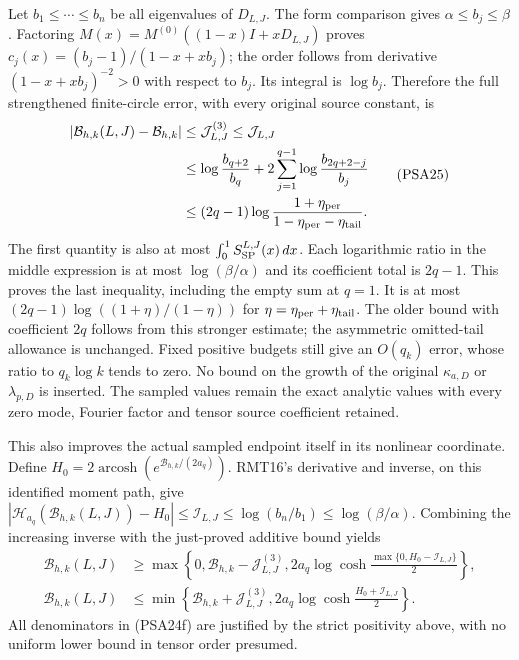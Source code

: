 Let $b_1\le\cdots\le b_n$ be all eigenvalues of $D_{L,J}$.
The form comparison gives $\alpha\le b_j\le\beta$.
Factoring $M(x)=M^{(0)}((1-x)I+xD_{L,J})$ proves
$c_j(x)=(b_j-1)/(1-x+xb_j)$; the order follows from derivative
$(1-x+xb_j)^{-2}>0$ with respect to $b_j$.
Its integral is $\log b_j$. Therefore the full strengthened
finite-circle error, with every original source constant, is
\[
 \begin{aligned}
 |\mathcal B_{h,k}(L,J)-\mathcal B_{h,k}|
 &\le\mathcal J^{(3)}_{L,J}\le\mathcal J_{L,J}\\
 &\le\log\frac{b_{q+2}}{b_q}
       +2\sum_{j=1}^{q-1}\log\frac{b_{2q+2-j}}{b_j}\\
 &\le(2q-1)\log\frac{1+\eta_{\rm per}}
                         {1-\eta_{\rm per}-\eta_{\rm tail}}.
 \end{aligned}
 \tag{PSA25}
\]
The first quantity is also at most $\int_0^1S_{\rm SP}^{L,J}(x)\,dx$.
Each logarithmic ratio in the middle expression is at most
$\log(\beta/\alpha)$ and its coefficient total is $2q-1$.
This proves the last inequality, including the empty sum at $q=1$.
It is at most $(2q-1)\log((1+\eta)/(1-\eta))$ for
$\eta=\eta_{\rm per}+\eta_{\rm tail}$. The older bound with
coefficient $2q$ follows from this stronger estimate; the
asymmetric omitted-tail allowance is unchanged.
Fixed positive budgets still give an $O(q_k)$ error, whose
ratio to $q_k\log k$ tends to zero. No bound on the growth of
the original $\kappa_{a,D}$ or $\lambda_{p,D}$ is inserted.
The sampled values remain the exact analytic values with every
zero mode, Fourier factor and tensor source coefficient retained.



This also improves the actual sampled endpoint itself in its
nonlinear coordinate. Define
$H_0=2\operatorname{arcosh}(e^{\mathcal B_{h,k}/(2a_q)})$.
RMT16's derivative and inverse, on this identified moment path,
give $|\mathscr H_{a_q}(\mathcal B_{h,k}(L,J))-H_0|
\le\mathcal I_{L,J}\le\log(b_n/b_1)\le\log(\beta/\alpha)$.
Combining the increasing inverse with the just-proved additive
bound yields
\[
 \begin{aligned}
 \mathcal B_{h,k}(L,J)&\ge\max\left\{0,
 \mathcal B_{h,k}-\mathcal J^{(3)}_{L,J},
 2a_q\log\cosh\frac{\max\{0,H_0-\mathcal I_{L,J}\}}2\right\},\\
 \mathcal B_{h,k}(L,J)&\le\min\left\{
 \mathcal B_{h,k}+\mathcal J^{(3)}_{L,J},
 2a_q\log\cosh\frac{H_0+\mathcal I_{L,J}}2\right\}.
 \end{aligned}
 \tag{PSA25a}
\]
All denominators in (PSA24f) are justified by the strict positivity
above, with no uniform lower bound in tensor order presumed.

